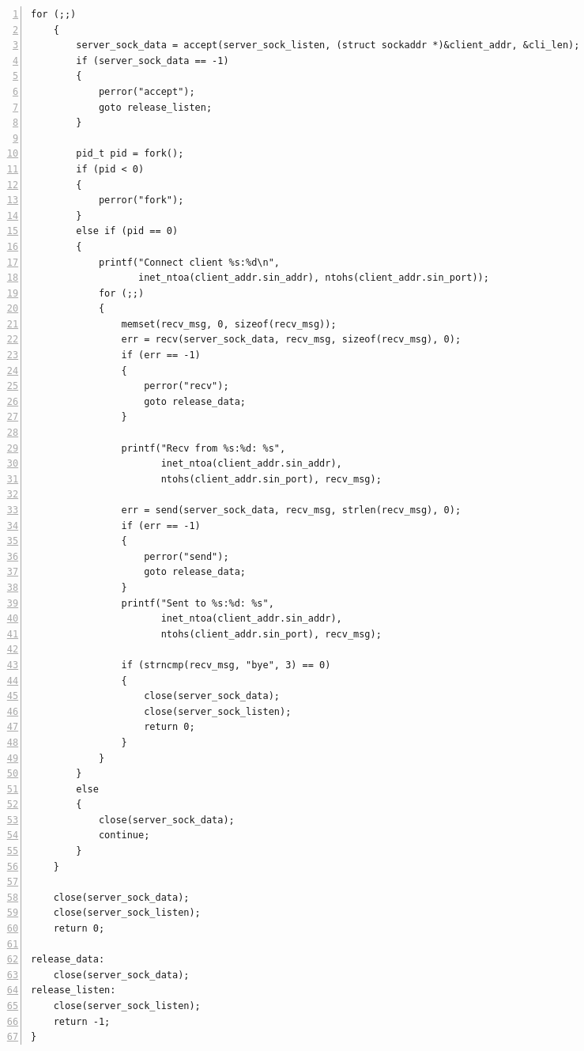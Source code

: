 \documentclass[a4paper,twoside]{article}
\begin{document}
\begin{spacing}{1.2}
\begin{lstlisting}[numbers=left,style=CppStyle,caption=服务器（并发）,label={code:server_parl}]
	for (;;)
	{
		server_sock_data = accept(server_sock_listen, (struct sockaddr *)&client_addr, &cli_len);
		if (server_sock_data == -1)
		{
			perror("accept");
			goto release_listen;
		}

		pid_t pid = fork();
		if (pid < 0)
		{
			perror("fork");
		}
		else if (pid == 0)
		{
			printf("Connect client %s:%d\n",
				   inet_ntoa(client_addr.sin_addr), ntohs(client_addr.sin_port));
			for (;;)
			{
				memset(recv_msg, 0, sizeof(recv_msg));
				err = recv(server_sock_data, recv_msg, sizeof(recv_msg), 0);
				if (err == -1)
				{
					perror("recv");
					goto release_data;
				}

				printf("Recv from %s:%d: %s",
					   inet_ntoa(client_addr.sin_addr),
					   ntohs(client_addr.sin_port), recv_msg);

				err = send(server_sock_data, recv_msg, strlen(recv_msg), 0);
				if (err == -1)
				{
					perror("send");
					goto release_data;
				}
				printf("Sent to %s:%d: %s",
					   inet_ntoa(client_addr.sin_addr),
					   ntohs(client_addr.sin_port), recv_msg);

				if (strncmp(recv_msg, "bye", 3) == 0)
				{
					close(server_sock_data);
					close(server_sock_listen);
					return 0;
				}
			}
		}
		else
		{
			close(server_sock_data);
			continue;
		}
	}

	close(server_sock_data);
	close(server_sock_listen);
	return 0;

release_data:
	close(server_sock_data);
release_listen:
	close(server_sock_listen);
	return -1;
}
\end{lstlisting}

\end{spacing}
\end{document}
